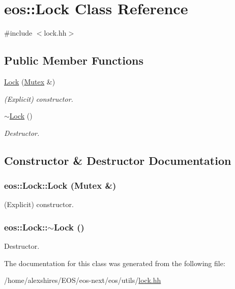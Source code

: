 \hypertarget{classeos_1_1Lock}{
\section{eos::Lock Class Reference}
\label{classeos_1_1Lock}
}


{\ttfamily \#include $<$lock.hh$>$}\subsection*{Public Member Functions}
\begin{DoxyCompactItemize}
\item 
\hyperlink{classeos_1_1Lock_a9d5a54ae7320ee6adc68711d7189fcd1}{Lock} (\hyperlink{classeos_1_1Mutex}{Mutex} \&)
\begin{DoxyCompactList}\small\item\em (Explicit) constructor. \item\end{DoxyCompactList}\item 
\hyperlink{classeos_1_1Lock_aa04c35d89ef9fcf1a87d40e34713ffc7}{$\sim$Lock} ()
\begin{DoxyCompactList}\small\item\em Destructor. \item\end{DoxyCompactList}\end{DoxyCompactItemize}


\subsection{Constructor \& Destructor Documentation}
\hypertarget{classeos_1_1Lock_a9d5a54ae7320ee6adc68711d7189fcd1}{
\subsubsection[{Lock}]{\setlength{\rightskip}{0pt plus 5cm}eos::Lock::Lock ({\bf Mutex} \&)}}
\label{classeos_1_1Lock_a9d5a54ae7320ee6adc68711d7189fcd1}


(Explicit) constructor. \hypertarget{classeos_1_1Lock_aa04c35d89ef9fcf1a87d40e34713ffc7}{
\subsubsection[{$\sim$Lock}]{\setlength{\rightskip}{0pt plus 5cm}eos::Lock::$\sim$Lock ()}}
\label{classeos_1_1Lock_aa04c35d89ef9fcf1a87d40e34713ffc7}


Destructor. 

The documentation for this class was generated from the following file:\begin{DoxyCompactItemize}
\item 
/home/alexshires/EOS/eos-\/next/eos/utils/\hyperlink{lock_8hh}{lock.hh}\end{DoxyCompactItemize}
